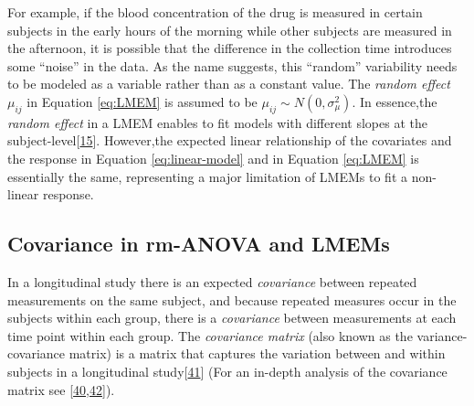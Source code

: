 \documentclass[
]{article}
\begin{document}
For example, if the blood concentration of the drug is measured in certain subjects in the early hours of the morning while other subjects are measured in the afternoon, it is possible that the difference in the collection time introduces some ``noise'' in the data. As the name suggests, this ``random'' variability needs to be modeled as a variable rather than as a constant value. The \emph{random effect} \(\mu_{ij}\) in Equation \eqref{eq:LMEM} is assumed to be \(\mu_{ij} \sim N(0,\sigma^2_\mu)\). In essence,the \emph{random effect} in a LMEM enables to fit models with different slopes at the subject-level{[}\protect\hyperlink{ref-pinheiro2006}{15}{]}. However,the expected linear relationship of the covariates and the response in Equation \eqref{eq:linear-model} and in Equation \eqref{eq:LMEM} is essentially the same, representing a major limitation of LMEMs to fit a non-linear response.

\hypertarget{covariance-in-rm-anova-and-lmems}{%
\subsection{Covariance in rm-ANOVA and LMEMs}\label{covariance-in-rm-anova-and-lmems}}

In a longitudinal study there is an expected \emph{covariance} between repeated measurements on the same subject, and because repeated measures occur in the subjects within each group, there is a \emph{covariance} between measurements at each time point within each group. The \emph{covariance matrix} (also known as the variance-covariance matrix) is a matrix that captures the variation between and within subjects in a longitudinal study{[}\protect\hyperlink{ref-wolfinger1996}{41}{]} (For an in-depth analysis of the covariance matrix see {[}\protect\hyperlink{ref-west2014}{40},\protect\hyperlink{ref-weiss2005}{42}{]}).
\end{document}

